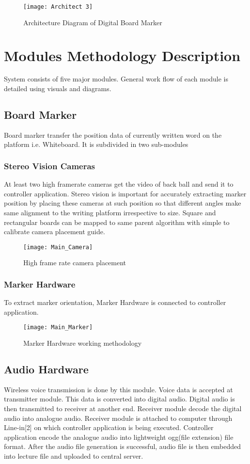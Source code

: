 \begin{figure}[h]
  \centering
  \texttt{[image: Architect 3]}
  \caption{Architecture Diagram of Digital Board Marker}
\end{figure}
\bigskip

\section{Modules Methodology Description}
System consists of five major modules. General work flow of each module is detailed using visuals and diagrams.
\subsection{Board Marker}
Board marker transfer the position data of currently written word on the platform i.e. Whiteboard. It is subdivided in two sub-modules
\subsubsection{Stereo Vision Cameras}
At least two high framerate cameras get the video of back ball and send it to controller application. Stereo vision is important for accurately extracting marker position by placing these cameras at such position so that different angles make same alignment to the writing platform irrespective to size. Square and rectangular boards can be mapped to same parent algorithm with simple to calibrate camera placement guide.

\bigskip

\begin{figure}[h]
  \centering
  \texttt{[image: Main\_Camera]}
  \caption{High frame rate camera placement}
\end{figure}

\subsubsection{Marker Hardware}
To extract marker orientation, Marker Hardware is connected to controller application.
\newpage
\bigskip
\bigskip
\begin{figure}[h]
  \centering
  \texttt{[image: Main\_Marker]}
  \caption{Marker Hardware working methodology}
\end{figure}

\bigskip
\bigskip
\subsection{Audio Hardware}
Wireless voice transmission is done by this module. Voice data is accepted at transmitter module. This data is converted into digital audio. Digital audio is then transmitted to receiver at another end. Receiver module decode the digital audio into analogue audio. Receiver module is attached to computer through Line-in[2] on which controller application is being executed. Controller application encode the analogue audio into lightweight ogg(file extension) file format. After the audio file generation is successful, audio file is then embedded into lecture file and uploaded to central server.

